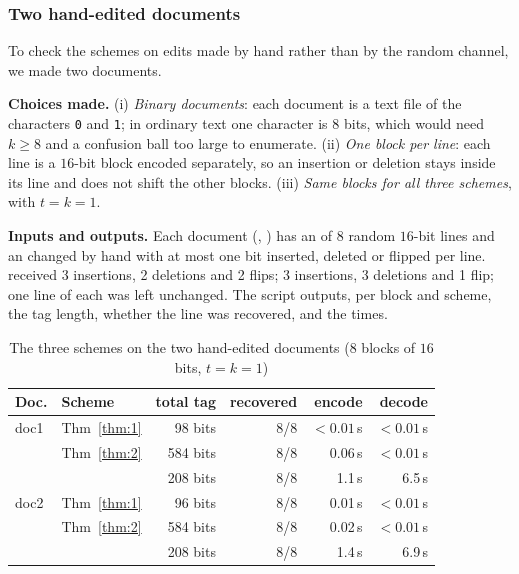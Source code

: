 \documentclass[journal,10pt]{IEEEtran}
\begin{document}
\subsubsection{Two hand-edited documents}\label{sec:docs}
To check the schemes on edits made by hand rather than by the random channel, we made two documents.

\textbf{Choices made.} (i) \emph{Binary documents}: each document is a text file of the characters \texttt{0} and \texttt{1}; in ordinary text one character is $8$ bits, which would need $k\ge8$ and a confusion ball too large to enumerate. (ii) \emph{One block per line}: each line is a $16$-bit block encoded separately, so an insertion or deletion stays inside its line and does not shift the other blocks. (iii) \emph{Same blocks for all three schemes}, with $t=k=1$.

\textbf{Inputs and outputs.} Each document (, ) has an  of $8$ random $16$-bit lines and an  changed by hand with at most one bit inserted, deleted or flipped per line.  received 3 insertions, 2 deletions and 2 flips;  3 insertions, 3 deletions and 1 flip; one line of each was left unchanged. The script  outputs, per block and scheme, the tag length, whether the line was recovered, and the times.

\begin{table}[!t]
\caption{The three schemes on the two hand-edited documents ($8$ blocks of $16$ bits, $t=k=1$)}\label{tab:docs}
\centering\footnotesize
\setlength{\tabcolsep}{3pt}
\begin{tabular}{@{}llrrrr@{}}
\toprule
Doc. & Scheme & total tag & recovered & encode & decode\\
\midrule
doc1 & Thm~\ref{thm:1} & 98 bits & 8/8 & $<0.01$\,s & $<0.01$\,s\\
 & Thm~\ref{thm:2} & 584 bits & 8/8 & 0.06\,s & $<0.01$\,s\\
 & \cite{li21} & 208 bits & 8/8 & 1.1\,s & 6.5\,s\\
\midrule
doc2 & Thm~\ref{thm:1} & 96 bits & 8/8 & 0.01\,s & $<0.01$\,s\\
 & Thm~\ref{thm:2} & 584 bits & 8/8 & 0.02\,s & $<0.01$\,s\\
 & \cite{li21} & 208 bits & 8/8 & 1.4\,s & 6.9\,s\\
\bottomrule
\end{tabular}
\end{table}
\end{document}
